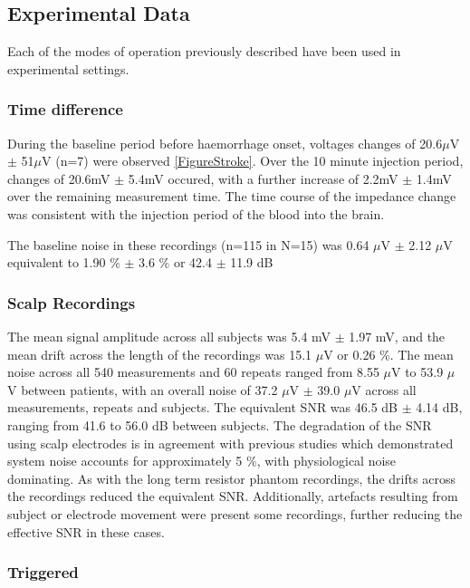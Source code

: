 \subsection{Experimental Data}

Each of the modes of operation previously described have been used in experimental settings. 

\subsubsection{Time difference}
During the baseline period before haemorrhage onset, voltages changes of 20.6\(\mu\)V \(\pm\) 51\(\mu\)V (n=7) were observed \ref{FigureStroke}. Over the 10 minute injection period, changes of 20.6mV \(\pm\) 5.4mV occured, with a further increase of 2.2mV \(\pm\) 1.4mV over the remaining measurement time. The time course of the impedance change was consistent with the injection period of the blood into the brain. 

The baseline noise in these recordings (n=115 in N=15) was 0.64 $\mu$V $\pm$ 2.12 $\mu$V equivalent to 1.90 \% $\pm$ 3.6 \% or 42.4 $\pm$ 11.9 dB







\subsubsection{Scalp Recordings}
The mean signal amplitude across all subjects was 5.4 mV $\pm$ 1.97 mV, and the mean drift across the length of the recordings was 15.1 $\mu$V or 0.26 \%. The mean noise across all 540 measurements and 60 repeats ranged from 8.55 $\mu$V to 53.9 $\mu$V between patients, with an overall noise of 37.2  $\mu$V $\pm$ 39.0 $\mu$V across all measurements, repeats and subjects. The equivalent SNR was 46.5 dB $\pm$ 4.14 dB, ranging from 41.6 to 56.0 dB between subjects. The degradation of the SNR using scalp electrodes is in agreement with previous studies \cite{fabrizi2007analysis} which demonstrated system noise accounts for approximately 5 \%, with physiological noise dominating. As with the long term resistor phantom recordings, the drifts across the recordings reduced the equivalent SNR. Additionally, artefacts resulting from subject or electrode movement were present some recordings, further reducing the effective SNR in these cases.  

\subsubsection{Triggered}

